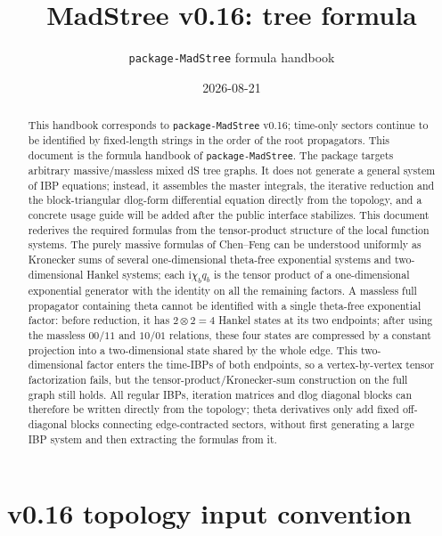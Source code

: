 \documentclass[11pt,a4paper]{article}
\title{MadStree v0.16: tree formula}
\author{\texttt{package-MadStree} formula handbook}
\date{2026-08-21}
\newcommand{\ii}{\mathrm i}
\begin{document}
\maketitle

\begin{abstract}
This handbook corresponds to \texttt{package-MadStree} v0.16; time-only sectors continue to be identified by fixed-length strings in the order of the root propagators.
This document is the formula handbook of \texttt{package-MadStree}. The package targets arbitrary massive/massless mixed dS tree graphs. It does not generate a general system of IBP equations; instead, it assembles the master integrals, the iterative reduction and the block-triangular dlog-form differential equation directly from the topology, and a concrete usage guide will be added after the public interface stabilizes. This document rederives the required formulas from the tensor-product structure of the local function systems. The purely massive formulas of Chen--Feng can be understood uniformly as Kronecker sums of several one-dimensional theta-free exponential systems and two-dimensional Hankel systems; each $\ii\chi_bq_b$ is the tensor product of a one-dimensional exponential generator with the identity on all the remaining factors. A massless full propagator containing theta cannot be identified with a single theta-free exponential factor: before reduction, it has $2\otimes2=4$ Hankel states at its two endpoints; after using the massless $00/11$ and $10/01$ relations, these four states are compressed by a constant projection into a two-dimensional state shared by the whole edge. This two-dimensional factor enters the time-IBPs of both endpoints, so a vertex-by-vertex tensor factorization fails, but the tensor-product/Kronecker-sum construction on the full graph still holds. All regular IBPs, iteration matrices and dlog diagonal blocks can therefore be written directly from the topology; theta derivatives only add fixed off-diagonal blocks connecting edge-contracted sectors, without first generating a large IBP system and then extracting the formulas from it.
\end{abstract}

\tableofcontents

\section{v0.16 topology input convention}
\end{document}
